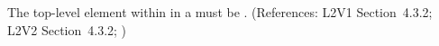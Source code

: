 The top-level element within  in a \FunctionDefinition must be
.  (References: L2V1 Section~4.3.2; L2V2 Section~4.3.2;
)
